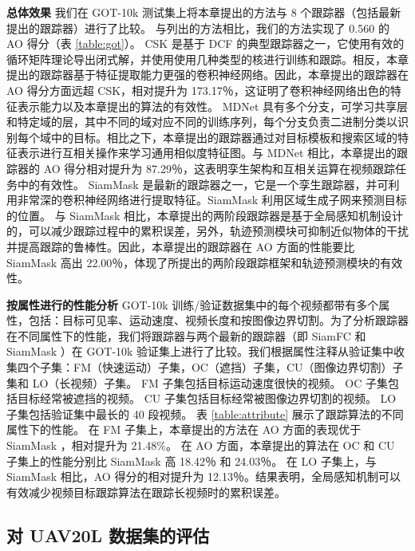 \textbf{总体效果}
我们在 GOT-10k 测试集上将本章提出的方法与 8 个跟踪器（包括最新提出的跟踪器）进行了比较。
与列出的方法相比，我们的方法实现了 0.560 的 AO 得分（表 \ref{table:got}）。
CSK 是基于 DCF 的典型跟踪器之一，它使用有效的循环矩阵理论导出闭式解，并使用使用几种类型的核进行训练和跟踪。相反，本章提出的跟踪器基于特征提取能力更强的卷积神经网络。因此，本章提出的跟踪器在 AO 得分方面远超 CSK，相对提升为 173.17％，这证明了卷积神经网络出色的特征表示能力以及本章提出的算法的有效性。
MDNet 具有多个分支，可学习共享层和特定域的层，其中不同的域对应不同的训练序列，每个分支负责二进制分类以识别每个域中的目标。相比之下，本章提出的跟踪器通过对目标模板和搜索区域的特征表示进行互相关操作来学习通用相似度特征图。与 MDNet 相比，本章提出的跟踪器的 AO 得分相对提升为 87.29％，这表明孪生架构和互相关运算在视频跟踪任务中的有效性。
SiamMask 是最新的跟踪器之一，它是一个孪生跟踪器，并可利用非常深的卷积神经网络进行提取特征。SiamMask 利用区域生成子网来预测目标的位置。
与 SiamMask \cite{Wang2018SiamMask} 相比，本章提出的两阶段跟踪器是基于全局感知机制设计的，可以减少跟踪过程中的累积误差，另外，轨迹预测模块可抑制近似物体的干扰并提高跟踪的鲁棒性。因此，本章提出的跟踪器在 AO 方面的性能要比 SiamMask 高出 22.00％，体现了所提出的两阶段跟踪框架和轨迹预测模块的有效性。

\textbf{按属性进行的性能分析}
GOT-10k 训练/验证数据集中的每个视频都带有多个属性，包括：目标可见率、运动速度、视频长度和按图像边界切割。为了分析跟踪器在不同属性下的性能，我们将跟踪器与两个最新的跟踪器（即 SiamFC  \cite{SiamFC} 和 SiamMask \cite{Wang2018SiamMask}）在 GOT-10k 验证集上进行了比较。我们根据属性注释从验证集中收集四个子集：FM（快速运动）子集，OC（遮挡）子集，CU（图像边界切割）子集和 LO（长视频）子集。
FM 子集包括目标运动速度很快的视频。
OC 子集包括目标经常被遮挡的视频。
CU 子集包括目标经常被图像边界切割的视频。
LO 子集包括验证集中最长的 40 段视频。
表 \ref{table:attribute} 展示了跟踪算法的不同属性下的性能。
在 FM 子集上，本章提出的方法在 AO 方面的表现优于 SiamMask \cite{Wang2018SiamMask}，相对提升为 21.48\%。
在 AO 方面，本章提出的算法在 OC 和 CU 子集上的性能分别比 SiamMask 高 18.42％ 和 24.03％。
在 LO 子集上，与 SiamMask 相比，AO 得分的相对提升为 12.13％。结果表明，全局感知机制可以有效减少视频目标跟踪算法在跟踪长视频时的累积误差。

\subsection{对 UAV20L 数据集的评估}

